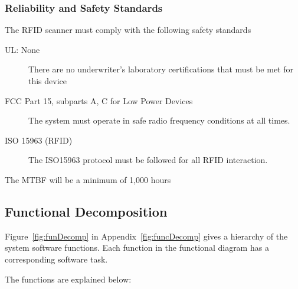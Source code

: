 \documentclass[12pt]{article} %
\begin{document}
\subsubsection{Reliability and Safety Standards}\label{safety}

The RFID scanner must comply with the following safety standards

\begin{description}
	\item[UL: None] There are no underwriter's laboratory certifications that must be met for this device 
	\item[FCC Part 15, subparts A, C for Low Power Devices]  The system must operate in safe radio frequency conditions at all times.
	\item[ISO 15963 (RFID)] The ISO15963 protocol must be followed for all RFID interaction.
\end{description}

The MTBF will be a minimum of 1,000 hours

\subsection{Functional Decomposition}\label{functions} %

Figure~\ref{fig:funDecomp} in Appendix~\ref{fig:funcDecomp} gives a hierarchy
of the system software functions. Each function in the functional diagram has a
corresponding software task.

The functions are explained below:
\end{document}
